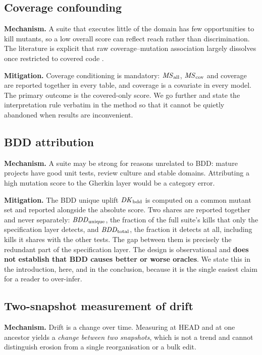 \subsection{Coverage confounding}

\textbf{Mechanism.} A suite that executes little of the domain has few opportunities to kill mutants,
so a low overall score can reflect reach rather than discrimination. The literature is explicit that
raw coverage--mutation association largely dissolves once restricted to covered code
\citep{Jain2023MindTheGap}.

\textbf{Mitigation.} Coverage conditioning is mandatory: $\mathit{MS}_{\mathrm{all}}$, $\mathit{MS}_{\mathrm{cov}}$ and coverage are reported
together in every table, and coverage is a covariate in every model. The primary outcome is the
covered-only score. We go further and state the interpretation rule verbatim in the method so that it
cannot be quietly abandoned when results are inconvenient.

\subsection{BDD attribution}

\textbf{Mechanism.} A suite may be strong for reasons unrelated to BDD: mature projects have good unit
tests, review culture and stable domains. Attributing a high mutation score to the Gherkin layer would
be a category error.

\textbf{Mitigation.} The BDD unique uplift $\mathit{DK}_{\mathrm{bdd}}$ is computed on a common mutant set and reported
alongside the absolute score. Two shares are reported together and never separately:
$\mathit{BDD}_{\mathrm{unique}}$, the fraction of the full suite's kills that only the specification layer detects, and
$\mathit{BDD}_{\mathrm{total}}$, the fraction it detects at all, including kills it shares with the other tests. The gap
between them is precisely the redundant part of the specification layer. The design is observational and \textbf{does not establish that BDD causes better
or worse oracles}. We state this in the introduction, here, and in the conclusion, because it is the
single easiest claim for a reader to over-infer.

\subsection{Two-snapshot measurement of drift}

\textbf{Mechanism.} Drift is a change over time. Measuring at HEAD and at one ancestor yields a
\emph{change between two snapshots}, which is not a trend and cannot distinguish erosion from a single
reorganisation or a bulk edit.

